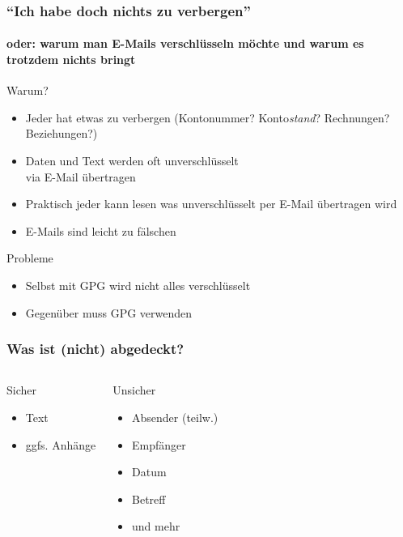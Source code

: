 \documentclass{beamer}
\begin{document}
\begin{frame}
  \frametitle{``Ich habe doch nichts zu verbergen''}
  \framesubtitle{oder: warum man E-Mails verschlüsseln möchte und warum es trotzdem nichts bringt}

  \begin{block}{Warum?}
    \begin{itemize}
    \item Jeder hat etwas zu verbergen (Kontonummer? Konto\emph{stand}?
      Rechnungen? Beziehungen?)
    \item Daten und Text werden oft unverschlüsselt\\via E-Mail übertragen
    \small
    \item Praktisch jeder kann lesen was unverschlüsselt per E-Mail übertragen
      wird
    \item E-Mails sind leicht zu fälschen
    \end{itemize}
  \end{block}
  \pause
  \begin{block}{Probleme}
    \begin{itemize}
    \item Selbst mit GPG wird nicht alles verschlüsselt
    \item Gegenüber muss GPG verwenden
    \end{itemize}
  \end{block}
\end{frame}

\begin{frame}
  \frametitle{Was ist (nicht) abgedeckt?}
  \begin{columns}
    \begin{block}{Sicher}
      \begin{itemize}
      \item Text
      \item ggfs. Anhänge
      \end{itemize}
    \end{block}
    \begin{block}{Unsicher}
      \begin{itemize}
      \item Absender (teilw.)
      \item Empfänger
      \item Datum
      \item Betreff
      \item und mehr
      \end{itemize}
    \end{block}
  \end{columns}
\end{frame}
\end{document}
